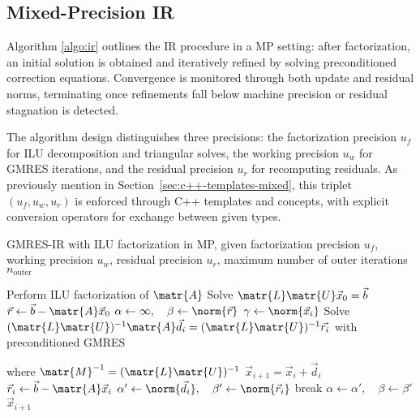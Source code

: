 \subsection{Mixed-Precision IR}
\label{sec:mixed-precision-ir}

Algorithm \ref{algo:ir} outlines the IR procedure in a MP setting: after
factorization, an initial solution is obtained and iteratively refined by
solving preconditioned correction equations. Convergence is monitored through
both update and residual norms, terminating once refinements fall below machine
precision or residual stagnation is detected.

The algorithm design distinguishes three precisions: the factorization precision
\(u_f\) for ILU decomposition and triangular solves, the working precision
\(u_w\) for GMRES iterations, and the residual precision \(u_r\) for recomputing
residuals. As previously mention in Section~\ref{sec:c++-templates-mixed}, this
triplet \((u_f, u_w, u_r)\) is enforced through C++ templates and concepts, with
explicit conversion operators for exchange between given types.

\begin{singlespace}
  \begin{algorithm}[h]
    \caption{GMRES-IR with ILU factorization in MP, given factorization
      precision \(u_f\), working precision \(u_w\), residual precision \(u_r\),
      maximum number of outer iterations \(n_{\text{outer}}\)}
    \label{algo:ir}
    \begin{algorithmic}[1]
      \State Perform ILU factorization of \(\matr{A}\) 
      \State Solve \(\matr{L}\matr{U} \vec{x}_0 = \vec{b}\) 
      \State \(\vec{r} \gets \vec{b} - \matr{A}\vec{x}_0\) 
      \State \(\alpha \gets \infty, \quad \beta \gets \norm{\vec{r}}\)
        \State \(\gamma \gets \norm{\vec{x}_i}\)
        \State Solve \((\matr{L}\matr{U})^{-1}\matr{A}\vec{d}_i =
        (\matr{L}\matr{U})^{-1}\vec{r_i}\) with preconditioned GMRES \par
        where \(\matr{M}^{-1} = (\matr{L}\matr{U})^{-1}\) 
        \State \(\vec{x}_{i+1} = \vec{x}_i + \vec{d}_i\) 
        \State \(\vec{r}_i \gets \vec{b} - \matr{A}\vec{x}_i\) 
        \State \(\alpha' \gets \norm{\vec{d}_i}, \quad \beta' \gets \norm{\vec{r}_i}\)
          \State break
        \EndIf
        \State \(\alpha \gets \alpha', \quad \beta \gets \beta'\)
      \EndFor
      \State \Return \(\vec{x}_{i+1}\)
    \end{algorithmic}
  \end{algorithm}
\end{singlespace}
